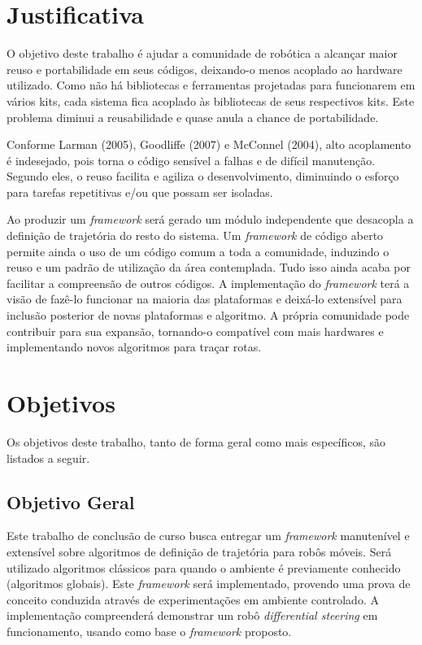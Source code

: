 \section{Justificativa}

O objetivo deste trabalho é ajudar a comunidade de robótica a alcançar maior reuso e portabilidade em seus códigos, deixando-o menos acoplado ao hardware utilizado. Como não há bibliotecas e ferramentas projetadas para funcionarem em vários kits, cada sistema fica acoplado às bibliotecas de seus respectivos kits. Este problema diminui a reusabilidade e quase anula a chance de portabilidade.

Conforme Larman (2005), Goodliffe (2007) e McConnel (2004), alto acoplamento é indesejado, pois torna o código sensível a falhas e de difícil manutenção. Segundo eles, o reuso facilita e agiliza o desenvolvimento, diminuindo o esforço para tarefas repetitivas e/ou que possam ser isoladas.

Ao produzir um \textit{framework} será gerado um módulo independente que desacopla a definição de trajetória do resto do sistema. Um \textit{framework} de código aberto permite ainda o uso de um código comum a toda a comunidade, induzindo o reuso e um padrão de utilização da área contemplada. Tudo isso ainda acaba por facilitar a compreensão de outros códigos. A implementação do \textit{framework} terá a visão de fazê-lo funcionar na maioria das plataformas e deixá-lo extensível para inclusão posterior de novas plataformas e algoritmo. A própria comunidade pode contribuir para sua expansão, tornando-o compatível com mais hardwares e implementando novos algoritmos para traçar rotas.

\section{Objetivos}

Os objetivos deste trabalho, tanto de forma geral como mais específicos, são listados a seguir.

\subsection{Objetivo Geral}

Este trabalho de conclusão de curso busca entregar um \textit{framework} manutenível e extensível sobre algoritmos de definição de trajetória para robôs móveis. Será utilizado algoritmos clássicos para quando o ambiente é previamente conhecido (algoritmos globais). Este \textit{framework} será implementado, provendo uma prova de conceito conduzida através de experimentações em ambiente controlado. A implementação compreenderá demonstrar um robô \textit{differential steering} em funcionamento, usando como base o \textit{framework} proposto.

